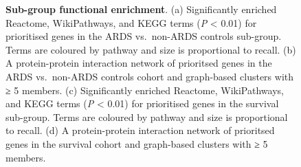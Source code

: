 \documentclass[
  11,
  a4paper,
]{article}
\begin{document}
\begin{figure}


\caption{\label{fig-fig4}\textbf{Sub-group functional enrichment}. (a)
Significantly enriched Reactome, WikiPathways, and KEGG terms (\emph{P}
\textless{} 0.01) for prioritised genes in the ARDS vs.~non-ARDS
controls sub-group. Terms are coloured by pathway and size is
proportional to recall. (b) A protein-protein interaction network of
prioritsed genes in the ARDS vs.~non-ARDS controls cohort and
graph-based clusters with ≥ 5 members. (c) Significantly enriched
Reactome, WikiPathways, and KEGG terms (\emph{P} \textless{} 0.01) for
prioritised genes in the survival sub-group. Terms are coloured by
pathway and size is proportional to recall. (d) A protein-protein
interaction network of prioritsed genes in the survival cohort and
graph-based clusters with ≥ 5 members.}

\end{figure}%
\end{document}
